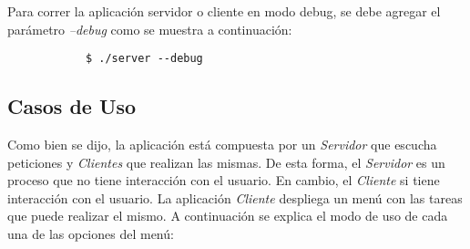 \documentclass[a4paper,10pt]{article}
\begin{document}
		Para correr la aplicaci\'on servidor o cliente en modo debug, se debe agregar el par\'ametro \emph{--debug} como se muestra a continuaci\'on:
		\begin{verbatim}
			$ ./server --debug
		\end{verbatim}

		\subsection{Casos de Uso}

			Como bien se dijo, la aplicaci\'on est\'a compuesta por un \emph{Servidor} que escucha peticiones y \emph{Clientes} que realizan las mismas. 
			De esta forma, el \emph{Servidor} es un proceso que no tiene interacci\'on con el usuario. En cambio, el \emph{Cliente} si tiene interacci\'on
			con el usuario. La aplicaci\'on \emph{Cliente} despliega un men\'u con las tareas que puede realizar el mismo. A continuaci\'on se 
			explica el modo de uso de cada una de las opciones del men\'u: 
\end{document}
